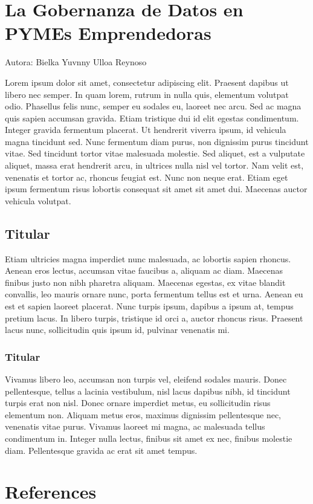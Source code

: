 \documentclass[
  letterpaper,
  DIV=11,
  numbers=noendperiod]{scrreprt}
\newlength{\cslhangindent}
\newlength{\cslentryspacingunit} %
\newenvironment{CSLReferences}[2] %
 {%
  \setlength{\parindent}{0pt}
  \ifodd #1
  \let\oldpar\par
  \def\par{\hangindent=\cslhangindent\oldpar}
  \fi
  \setlength{\parskip}{#2\cslentryspacingunit}
 }%
 {}
\begin{document}
\hypertarget{la-gobernanza-de-datos-en-pymes-emprendedoras}{%
\chapter{La Gobernanza de Datos en PYMEs
Emprendedoras}\label{la-gobernanza-de-datos-en-pymes-emprendedoras}}

Autora: Bielka Yuvnny Ulloa Reynoso

Lorem ipsum dolor sit amet, consectetur adipiscing elit. Praesent
dapibus ut libero nec semper. In quam lorem, rutrum in nulla quis,
elementum volutpat odio. Phasellus felis nunc, semper eu sodales eu,
laoreet nec arcu. Sed ac magna quis sapien accumsan gravida. Etiam
tristique dui id elit egestas condimentum. Integer gravida fermentum
placerat. Ut hendrerit viverra ipsum, id vehicula magna tincidunt sed.
Nunc fermentum diam purus, non dignissim purus tincidunt vitae. Sed
tincidunt tortor vitae malesuada molestie. Sed aliquet, est a vulputate
aliquet, massa erat hendrerit arcu, in ultrices nulla nisl vel tortor.
Nam velit est, venenatis et tortor ac, rhoncus feugiat est. Nunc non
neque erat. Etiam eget ipsum fermentum risus lobortis consequat sit amet
sit amet dui. Maecenas auctor vehicula volutpat.

\hypertarget{titular-12}{%
\section{Titular}\label{titular-12}}

Etiam ultricies magna imperdiet nunc malesuada, ac lobortis sapien
rhoncus. Aenean eros lectus, accumsan vitae faucibus a, aliquam ac diam.
Maecenas finibus justo non nibh pharetra aliquam. Maecenas egestas, ex
vitae blandit convallis, leo mauris ornare nunc, porta fermentum tellus
est et urna. Aenean eu est et sapien laoreet placerat. Nunc turpis
ipsum, dapibus a ipsum at, tempus pretium lacus. In libero turpis,
tristique id orci a, auctor rhoncus risus. Praesent lacus nunc,
sollicitudin quis ipsum id, pulvinar venenatis mi.

\hypertarget{titular-13}{%
\subsection{Titular}\label{titular-13}}

Vivamus libero leo, accumsan non turpis vel, eleifend sodales mauris.
Donec pellentesque, tellus a lacinia vestibulum, nisl lacus dapibus
nibh, id tincidunt turpis erat non nisl. Donec ornare imperdiet metus,
eu sollicitudin risus elementum non. Aliquam metus eros, maximus
dignissim pellentesque nec, venenatis vitae purus. Vivamus laoreet mi
magna, ac malesuada tellus condimentum in. Integer nulla lectus, finibus
sit amet ex nec, finibus molestie diam. Pellentesque gravida ac erat sit
amet tempus.


\hypertarget{references}{%
\chapter*{References}\label{references}}


\hypertarget{refs}{}
\begin{CSLReferences}{0}{0}
\end{CSLReferences}
\end{document}
